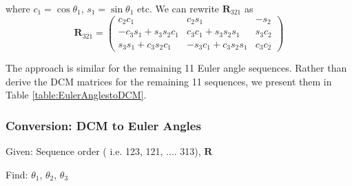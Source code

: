 %
where $c_1 =\cos{\theta_1}$, $s_1 = \sin{\theta_1}$ etc.  We can
rewrite $\mathbf{R}_{321} $ as
%
\begin{equation}
       \mathbf{R}_{321}  =\begin{pmatrix}
      c_2c_1              &  c_2s_1             & -s_2 \\
     -c_3s_1 + s_3s_2c_1  &  c_3c_1 + s_3s_2s_1 & s_3c_2 \\
     s_3s_1 + c_3s_2c_1   &  -s_3c_1 +c_3s_2s_1 & c_3c_2
     \end{pmatrix} \label{Eq:R321}
\end{equation}
%

The approach is similar for the remaining 11 Euler angle sequences.
Rather than derive the DCM matrices for the remaining 11 sequences,
we present them in Table \ref{table:EulerAnglestoDCM}.

\subsubsection{Conversion:  DCM to Euler Angles}
\label{sec:AttDCMtoEulerAngles}

Given:  Sequence order  ( i.e. 123, 121, .... 313), $\mathbf{R}$

\noindent Find:  $\theta_1$, $\theta_2$, $\theta_3$


